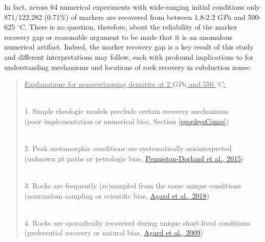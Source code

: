 In fact, across 64 numerical experiments with wide-ranging initial conditions only 871/122,282 (0.71\%) of markers are recovered from between 1.8-2.2 \(GPa\) and 500-625 \(^\circ C\). There is no question, therefore, about the reliability of the marker recovery gap or reasonable argument to be made that it is an anomalous numerical artifact. Indeed, the marker recovery gap is a key result of this study and different interpretations may follow, each with profound implications to for understanding mechanisms and locations of rock recovery in subduction zones:

\begin{quote}
\uline{Explanations for nonoverlapping densities at 2 $GPa$ and 550 $^\circ C$:}\\
\strut \\
\hspace*{0.333em}1. Simple rheologic models preclude certain recovery mechanisms\\
\hspace*{0.333em}\hspace*{0.333em}\hspace*{0.333em}\hspace*{0.333em}(poor implementation or numerical bias, Section \ref{geophysComp})\\
\strut \\
\hspace*{0.333em}2. Peak metamorphic conditions are systematically misinterpreted\\
\hspace*{0.333em}\hspace*{0.333em}\hspace*{0.333em}\hspace*{0.333em}(unknown \gls{pt} paths or petrologic bias, \protect\hyperlink{ref-penniston2015}{Penniston-Dorland et al., 2015})\\
\strut \\
\hspace*{0.333em}3. Rocks are frequently (re)sampled from the same unique conditions\\
\hspace*{0.333em}\hspace*{0.333em}\hspace*{0.333em}\hspace*{0.333em}(nonrandom sampling or scientific bias, \protect\hyperlink{ref-agard2018}{Agard et al., 2018})\\
\strut \\
\hspace*{0.333em}4. Rocks are sporadically recovered during unique short-lived conditions\\
\hspace*{0.333em}\hspace*{0.333em}\hspace*{0.333em}\hspace*{0.333em}(preferential recovery or natural bias, \protect\hyperlink{ref-agard2009}{Agard et al., 2009})
\end{quote}

